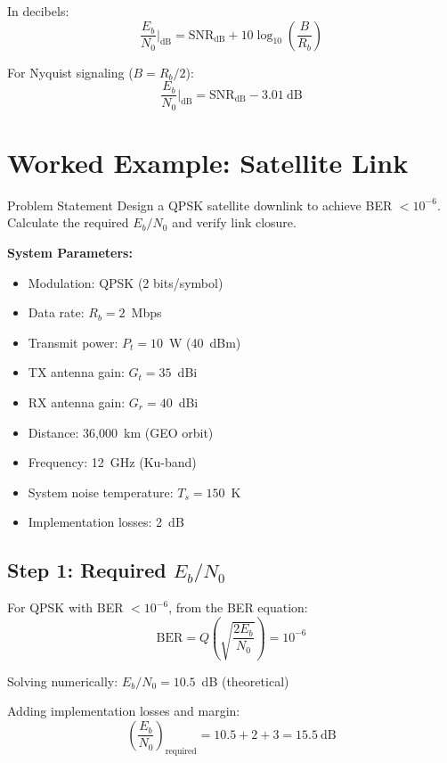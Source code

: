In decibels:
\begin{equation}
\frac{E_b}{N_0}\bigg|_{\text{dB}} = \mathrm{SNR}_{\text{dB}} + 10\log_{10}\left(\frac{B}{R_b}\right)
\end{equation}

For Nyquist signaling ($B = R_b/2$):
\begin{equation}
\frac{E_b}{N_0}\bigg|_{\text{dB}} = \mathrm{SNR}_{\text{dB}} - 3.01~\text{dB}
\end{equation}

\section{Worked Example: Satellite Link}

\begin{calloutbox}{Problem Statement}
Design a QPSK satellite downlink to achieve BER $< 10^{-6}$. Calculate the required $E_b/N_0$ and verify link closure.

\textbf{System Parameters:}
\begin{itemize}
\item Modulation: QPSK (2 bits/symbol)
\item Data rate: $R_b = 2$~Mbps
\item Transmit power: $P_t = 10$~W (40~dBm)
\item TX antenna gain: $G_t = 35$~dBi
\item RX antenna gain: $G_r = 40$~dBi  
\item Distance: 36,000~km (GEO orbit)
\item Frequency: 12~GHz (Ku-band)
\item System noise temperature: $T_s = 150$~K
\item Implementation losses: 2~dB
\end{itemize}
\end{calloutbox}

\subsection*{Step 1: Required $E_b/N_0$}

For QPSK with BER $< 10^{-6}$, from the BER equation:
\begin{equation}
\mathrm{BER} = Q\left(\sqrt{\frac{2E_b}{N_0}}\right) = 10^{-6}
\end{equation}

Solving numerically: $E_b/N_0 = 10.5$~dB (theoretical)

Adding implementation losses and margin:
\begin{equation}
\left(\frac{E_b}{N_0}\right)_{\text{required}} = 10.5 + 2 + 3 = 15.5~\text{dB}
\end{equation}

